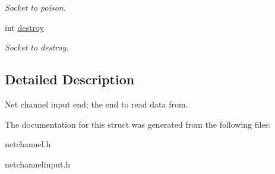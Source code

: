 \begin{DoxyCompactItemize}
\begin{DoxyCompactList}\small\item\em Socket to poison. \end{DoxyCompactList}\item 
\hypertarget{structnetChannelInput_aa35e03e040079ca1bb3baa5a6b337167}{int \hyperlink{structnetChannelInput_aa35e03e040079ca1bb3baa5a6b337167}{destroy}}\label{structnetChannelInput_aa35e03e040079ca1bb3baa5a6b337167}

\begin{DoxyCompactList}\small\item\em Socket to destroy. \end{DoxyCompactList}\end{DoxyCompactItemize}


\subsection{Detailed Description}
Net channel input end; the end to read data from. 

The documentation for this struct was generated from the following files\-:\begin{DoxyCompactItemize}
\item 
netchannel.\-h\item 
netchannelinput.\-h\end{DoxyCompactItemize}
